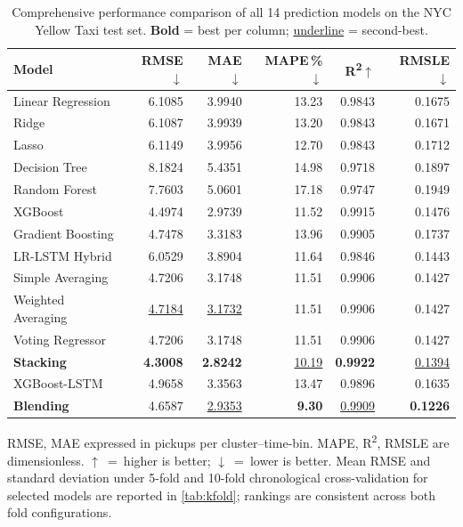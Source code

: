 \documentclass[a4paper,fleqn]{cas-dc}
\begin{document}
\begin{table}[t]
\centering
\caption{Comprehensive performance comparison of all 14 prediction models on the NYC Yellow Taxi test set. \textbf{Bold} = best per column; \underline{underline} = second-best.\label{tab:results_full}}
\begin{threeparttable}
\begin{tabular*}{\textwidth}{@{\extracolsep\fill}lrrrrr@{}}
\toprule
\textbf{Model} & \textbf{RMSE}$\downarrow$ & \textbf{MAE}$\downarrow$ & \textbf{MAPE\,\%}$\downarrow$ & \textbf{R\textsuperscript{2}}$\uparrow$ & \textbf{RMSLE}$\downarrow$ \\
\midrule
Linear Regression   & 6.1085 & 3.9940 & 13.23 & 0.9843 & 0.1675 \\
Ridge               & 6.1087 & 3.9939 & 13.20 & 0.9843 & 0.1671 \\
Lasso               & 6.1149 & 3.9956 & 12.70 & 0.9843 & 0.1712 \\
Decision Tree       & 8.1824 & 5.4351 & 14.98 & 0.9718 & 0.1897 \\
Random Forest       & 7.7603 & 5.0601 & 17.18 & 0.9747 & 0.1949 \\
XGBoost             & 4.4974 & 2.9739 & 11.52 & 0.9915 & 0.1476 \\
Gradient Boosting   & 4.7478 & 3.3183 & 13.96 & 0.9905 & 0.1737 \\
LR-LSTM Hybrid      & 6.0529 & 3.8904 & 11.64 & 0.9846 & 0.1443 \\
Simple Averaging    & 4.7206 & 3.1748 & 11.51 & 0.9906 & 0.1427 \\
Weighted Averaging  & \underline{4.7184} & \underline{3.1732} & 11.51 & 0.9906 & 0.1427 \\
Voting Regressor    & 4.7206 & 3.1748 & 11.51 & 0.9906 & 0.1427 \\
\textbf{Stacking}   & \textbf{4.3008} & \textbf{2.8242} & \underline{10.19} & \textbf{0.9922} & \underline{0.1394} \\
XGBoost-LSTM        & 4.9658 & 3.3563 & 13.47 & 0.9896 & 0.1635 \\
\textbf{Blending}   & 4.6587 & \underline{2.9353} & \textbf{9.30}  & \underline{0.9909} & \textbf{0.1226} \\
\bottomrule
\end{tabular*}
\begin{tablenotes}
  \small
  \item RMSE, MAE expressed in pickups per cluster--time-bin. MAPE, R\textsuperscript{2}, RMSLE are dimensionless. $\uparrow$~=~higher is better; $\downarrow$~=~lower is better. Mean RMSE and standard deviation under 5-fold and 10-fold chronological cross-validation for selected models are reported in \autoref{tab:kfold}; rankings are consistent across both fold configurations.
\end{tablenotes}
\end{threeparttable}
\end{table}
\end{document}
